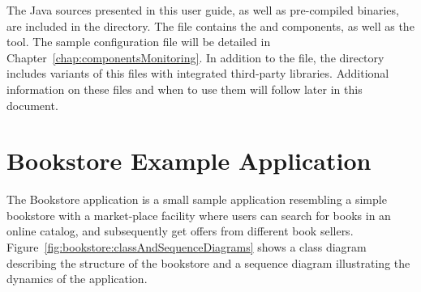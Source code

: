 \pagebreak

The Java sources presented in this user guide, as well as pre-compiled binaries, are included in the \file{\exampleDir/} directory. The file \file{\mainJar{}} contains the \KiekerMonitoringPart{} and \KiekerAnalysisPart{} components, as well as the \KiekerTraceAnalysis{} tool. The sample \KiekerMonitoringPart{}
configuration file %
\file{\kiekerMonitoringProperties{}} will be detailed in Chapter~\ref{chap:componentsMonitoring}. %
In addition to the \file{\mainJar{}} file, the  directory includes %
variants of this  files with integrated third-party libraries. Additional %
information on these  files and when to use them will follow later in this document. %


\section{Bookstore Example Application}\label{sec:example:bookstore}

The Bookstore application is a small sample application resembling a simple bookstore with a market-place facility where users can search for books in an online catalog, and subsequently get offers from different book sellers.
Figure~\ref{fig:bookstore:classAndSequenceDiagrams} shows a class diagram describing the structure of the bookstore and a sequence diagram illustrating the dynamics of the application.

